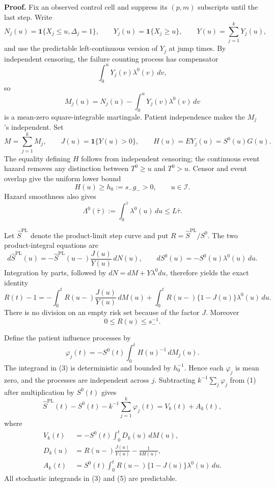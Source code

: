 \textbf{Proof.}
Fix an observed control cell and suppress its \((p,m)\) subscripts until the last step.  Write
\[
 N_j(u)=\mathbf 1\{X_j\le u,\Delta_j=1\},\qquad
 Y_j(u)=\mathbf 1\{X_j\ge u\},\qquad
 Y(u)=\sum_{j=1}^kY_j(u),
\]
and use the predictable left-continuous version of \(Y_j\) at jump times.  By independent censoring, the failure counting process has compensator
\[
 \int_0^uY_j(v)\lambda^0(v)\,dv,
\]
so
\[
 M_j(u)=N_j(u)-\int_0^uY_j(v)\lambda^0(v)\,dv
\]
is a mean-zero square-integrable martingale.  Patient independence makes the \(M_j\)'s independent.  Set
\[
 M=\sum_{j=1}^kM_j,\qquad J(u)=\mathbf 1\{Y(u)>0\},\qquad
 H(u)=E Y_j(u)=S^0(u)G(u).
\]
The equality defining \(H\) follows from independent censoring; the continuous event hazard removes any distinction between \(T^0\ge u\) and \(T^0>u\).  Censor and event overlap give the uniform lower bound
\[
 H(u)\ge h_0:=s_-g_->0,\qquad u\in\mathcal I.
\]
Hazard smoothness also gives
\[
 \Lambda^0(\bar\tau):=\int_0^{\bar\tau}\lambda^0(u)\,du
 \le L\bar\tau.
\]

Let \(\widehat S^{\mathrm{PL}}\) denote the product-limit step curve and put \(R=\widehat S^{\mathrm{PL}}/S^0\).  The two product-integral equations are
\[
 d\widehat S^{\mathrm{PL}}(u)
 =-\widehat S^{\mathrm{PL}}(u-)\frac{J(u)}{Y(u)}\,dN(u),
 \qquad
 dS^0(u)=-S^0(u)\lambda^0(u)\,du.
\]
Integration by parts, followed by \(dN=dM+Y\lambda^0du\), therefore yields the exact identity
\[
 R(t)-1
 =-\int_0^tR(u-)\frac{J(u)}{Y(u)}\,dM(u)
  +\int_0^tR(u-)\{1-J(u)\}\lambda^0(u)\,du.                 \tag{1}
\]
There is no division on an empty risk set because of the factor \(J\).  Moreover
\[
 0\le R(u)\le s_-^{-1}.                                      \tag{2}
\]

Define the patient influence processes by
\[
 \varphi_j(t)=-S^0(t)\int_0^tH(u)^{-1}\,dM_j(u).             \tag{3}
\]
The integrand in (3) is deterministic and bounded by \(h_0^{-1}\).  Hence each \(\varphi_j\) is mean zero, and the processes are independent across \(j\).  Subtracting \(k^{-1}\sum_j\varphi_j\) from (1) after multiplication by \(S^0(t)\) gives
\[
 \widehat S^{\mathrm{PL}}(t)-S^0(t)
 -k^{-1}\sum_{j=1}^k\varphi_j(t)=V_k(t)+A_k(t),              \tag{4}
\]
where
\[
 \begin{split}
 V_k(t)&=-S^0(t)\int_0^tD_k(u)\,dM(u),\\
 D_k(u)&=R(u-)\frac{J(u)}{Y(u)}-\frac{1}{kH(u)},\\
 A_k(t)&=S^0(t)\int_0^tR(u-)\{1-J(u)\}\lambda^0(u)\,du.
 \end{split}                                                   \tag{5}
\]
All stochastic integrands in (3) and (5) are predictable.

